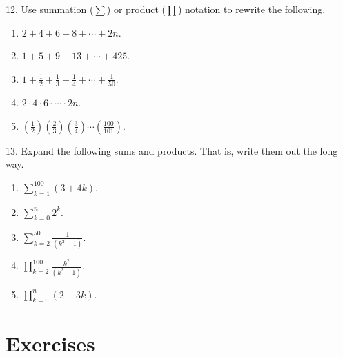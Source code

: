 \documentclass[10pt,]{book}
\theoremstyle{plain}
\theoremstyle{definition}
\numberwithin{equation}{chapter}
\def\d{\displaystyle}
\begin{document}
\begin{exerciselist}
\begin{enumerate}[label=(\alph*)]
\end{enumerate}
\par\smallskip
\item[12.]\hypertarget{exercise-160}{}
              Use summation (\(\sum\)) or product (\(\prod\)) notation to rewrite the following.
\leavevmode%
\begin{enumerate}[label=(\alph*)]
\item\hypertarget{li-540}{}\(2 + 4 + 6 + 8 + \cdots + 2n\).%
\item\hypertarget{li-541}{}\(1 + 5 + 9 + 13 + \cdots + 425\).%
\item\hypertarget{li-542}{}\(1 + \frac{1}{2} + \frac{1}{3} + \frac{1}{4} + \cdots + \frac{1}{50}\).%
\item\hypertarget{li-543}{}\(2 \cdot 4 \cdot 6 \cdot \cdots \cdot 2n\).%
\item\hypertarget{li-544}{}\((\frac{1}{2})(\frac{2}{3})(\frac{3}{4})\cdots(\frac{100}{101})\).%
\end{enumerate}
\par\smallskip
\item[13.]\hypertarget{exercise-161}{}
              Expand the following sums and products. That is, write them out the long way.
\leavevmode%
\begin{enumerate}[label=(\alph*)]
\item\hypertarget{li-550}{}\(\d\sum_{k=1}^{100} (3+4k)\).%
\item\hypertarget{li-551}{}\(\d\sum_{k=0}^n 2^k\).%
\item\hypertarget{li-552}{}\(\d\sum_{k=2}^{50}\frac{1}{(k^2 - 1)}\).%
\item\hypertarget{li-553}{}\(\d\prod_{k=2}^{100}\frac{k^2}{(k^2-1)}\).%
\item\hypertarget{li-554}{}\(\d\prod_{k=0}^n (2+3k)\).%
\end{enumerate}
\par\smallskip
\end{exerciselist}
\typeout{************************************************}
\typeout{************************************************}
\section[Exercises]{Exercises}\label{section-14}
\typeout{************************************************}
\typeout{************************************************}
\end{document}
